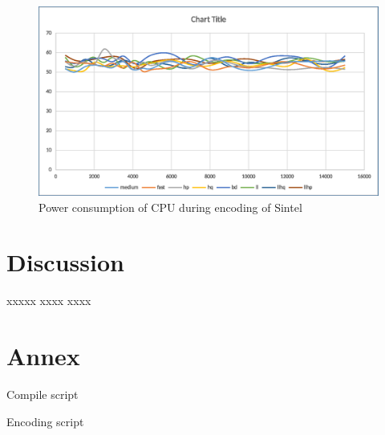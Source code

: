 \documentclass[12pt,twoside]{article}
\begin{document}
\begin{figure}[!h]
	\vspace{0pt}
	\centering
	\includegraphics[width=\textwidth]{img/h264nvencintelsintel.eps}
	\caption{Power consumption of CPU during encoding of Sintel}
	\label{fig:h264nvencintelsintel}
\end{figure}

\section{Discussion}
\label{sec:discussion}
xxxxx xxxx xxxx 

\printbibliography
\appendix
\section{Annex}
Compile script

Encoding script

\end{document}
